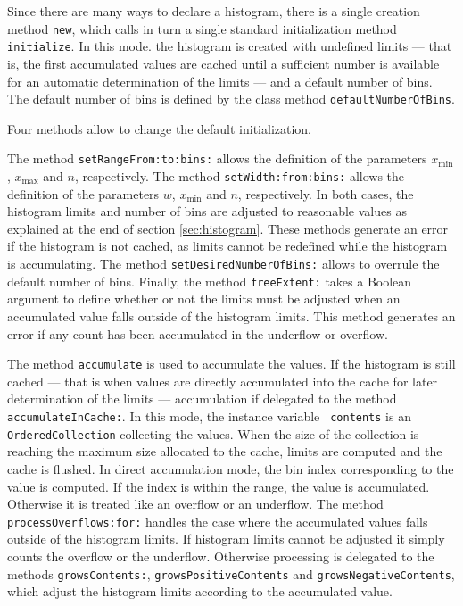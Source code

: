 \documentclass[twoside]{book}
\begin{document}
Since there are many ways to declare a histogram, there is a
single creation method {\tt new}, which calls in turn a single
standard initialization method {\tt initialize}. In this mode. the
histogram is created with undefined limits --- that is, the first
accumulated values are cached until a sufficient number is
available for an automatic determination of the limits --- and a
default number of bins. The default number of bins is defined by
the class method {\tt defaultNumberOfBins}.

\noindent Four methods allow to change the default initialization.

The method {\tt setRangeFrom:to:bins:} allows the definition of
the parameters $x_{\min}$, $x_{\max}$ and $n$, respectively. The
method {\tt setWidth:from:bins:} allows the definition of the
parameters $w$, $x_{\min}$ and $n$, respectively. In both cases,
the histogram limits and number of bins are adjusted to reasonable
values as explained at the end of section \ref{sec:histogram}.
These methods generate an error if the histogram is not cached, as
limits cannot be redefined while the histogram is accumulating.
The method {\tt setDesiredNumberOfBins:} allows to overrule the
default number of bins. Finally, the method {\tt freeExtent:}
takes a Boolean argument to define whether or not the limits must
be adjusted when an accumulated value falls outside of the
histogram limits. This method generates an error if any count has
been accumulated in the underflow or overflow.

The method {\tt accumulate} is used to accumulate the values. If
the histogram is still cached --- that is when values are directly
accumulated into the cache for later determination of the limits
--- accumulation if delegated to the method {\tt
accumulateInCache:}. In this mode, the instance variable {\tt
contents} is an {\tt OrderedCollection} collecting the values.
When the size of the collection is reaching the maximum size
allocated to the cache, limits are computed and the cache is
flushed. In direct accumulation mode, the bin index corresponding
to the value is computed. If the index is within the range, the
value is accumulated. Otherwise it is treated like an overflow or
an underflow. The method {\tt processOverflows:for:} handles the
case where the accumulated values falls outside of the histogram
limits. If histogram limits cannot be adjusted it simply counts
the overflow or the underflow. Otherwise processing is delegated
to the methods {\tt growsContents:}, {\tt growsPositiveContents}
and {\tt growsNegativeContents}, which adjust the histogram limits
according to the accumulated value.
\end{document}
